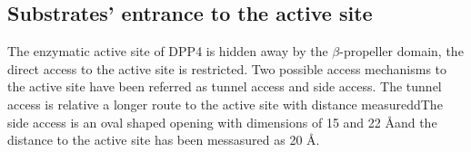 \subsection{Substrates' entrance to the active site}

The enzymatic active site of DPP4 is hidden away by the $\beta$-propeller domain, the direct access to the active site is restricted. Two possible access mechanisms to the active site have been referred as tunnel access and side access. The tunnel access is relative a longer route to the active site with distance measureddThe side access is an oval shaped opening with dimensions of 15 and 22 \AA and the distance to the active site has been messasured as 20 \AA.~\cite{Engel_2003}